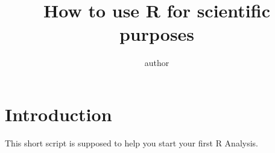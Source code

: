\documentclass{tufte-book} %
\title{How to use R for scientific purposes}
\author{author}
\begin{document}
\let\cleardoublepage\clearpage %
\maketitle
\newpage
\tableofcontents

\chapter{Introduction} %

This short script is supposed to help you start your first R Analysis. 

 
\end{document}
